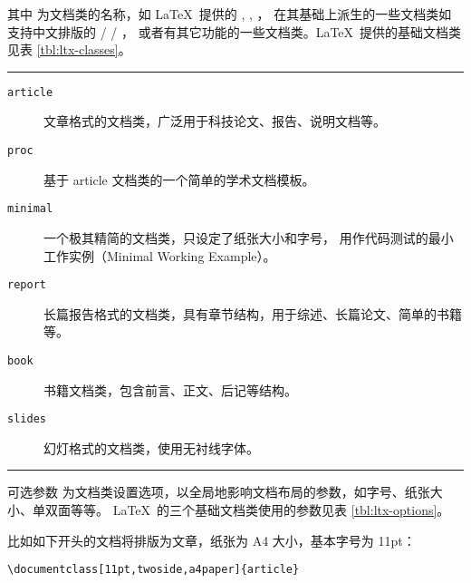 其中  为文档类的名称，如 \LaTeX\ 提供的 , , ，
在其基础上派生的一些文档类如支持中文排版的  /  / ，
或者有其它功能的一些文档类。\LaTeX\ 提供的基础文档类见表 \ref{tbl:ltx-classes}。

\begin{table}[!hbp]
\caption{\LaTeX\ 提供的基础文档类}\label{tbl:ltx-classes}
\hrule
\begin{flushleft}
\begin{description}
  \item [\normalfont\texttt{article}] 文章格式的文档类，广泛用于科技论文、报告、说明文档等。
  \item [\normalfont\texttt{proc}] 基于 article 文档类的一个简单的学术文档模板。
  \item [\normalfont\texttt{minimal}] 一个极其精简的文档类，只设定了纸张大小和字号，
  用作代码测试的最小工作实例（Minimal Working Example）。
  \item [\normalfont\texttt{report}] 长篇报告格式的文档类，具有章节结构，用于综述、长篇论文、简单的书籍等。
  \item [\normalfont\texttt{book}] 书籍文档类，包含前言、正文、后记等结构。
  \item [\normalfont\texttt{slides}] 幻灯格式的文档类，使用无衬线字体。
\end{description}
\end{flushleft}
\hrule
\end{table}

可选参数  为文档类设置选项，以全局地影响文档布局的参数，如字号、纸张大小、单双面等等。
\LaTeX\ 的三个基础文档类使用的参数见表 \ref{tbl:ltx-options}。

比如如下开头的文档将排版为文章，纸张为 A4 大小，基本字号为 11pt：
\begin{verbatim}
\documentclass[11pt,twoside,a4paper]{article}
\end{verbatim}

